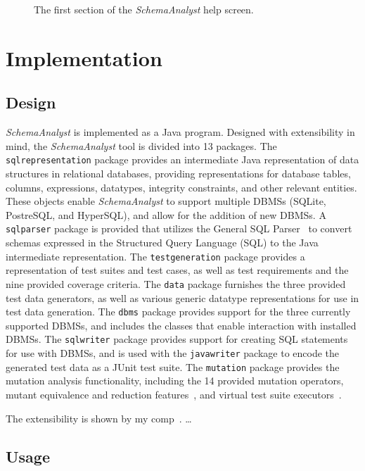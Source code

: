 \begin{figure}

\caption{\label{fig:usage} The first section of the \textit{SchemaAnalyst} help screen.}
\end{figure}

\section{Implementation}\label{sec:implementation}
\subsection{Design}
\textit{SchemaAnalyst} is implemented as a Java program.  Designed with extensibility in mind, the
\textit{SchemaAnalyst} tool is divided into 13 packages. The \texttt{sqlrepresentation} package
provides an intermediate Java representation of data structures in relational databases,
providing representations for database tables, columns, expressions, datatypes, integrity
constraints, and other relevant entities. These objects enable \textit{SchemaAnalyst} to support multiple
DBMSs (SQLite, PostreSQL, and HyperSQL), and allow for the addition of new DBMSs. A \texttt{sqlparser}
package is provided that utilizes the General SQL Parser~\cite{} to convert schemas expressed in the
Structured Query Language (SQL) to the Java intermediate representation. The \texttt{testgeneration} 
package provides a representation of test suites and test cases, as well as test requirements and the
nine provided coverage criteria. The \texttt{data} package furnishes the three provided test data generators,
as well as various generic datatype representations for use in test data generation. The \texttt{dbms} package
provides support for the three currently supported DBMSs, and includes the classes that enable interaction with
installed DBMSs. The \texttt{sqlwriter} package provides support for creating SQL statements for use
with DBMSs, and is used with the \texttt{javawriter} package to encode the generated test data as a
JUnit test suite. The \texttt{mutation} package provides the mutation analysis functionality, 
including the 14 provided mutation operators, mutant equivalence and reduction features~\cite{wright2014impact}, and virtual test suite executors~\cite{mcminn2016virtual}.

The extensibility is shown by my comp~\cite{kinneer2016comp}. \dots
\subsection{Usage}

